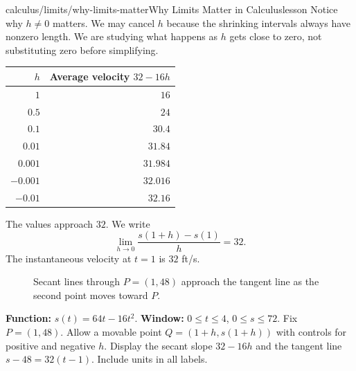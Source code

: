 \begin{webpage}{calculus/limits/why-limits-matter}{Why Limits Matter in Calculus}{lesson}
Notice why \(h\ne0\) matters. We may cancel \(h\) because the shrinking intervals always have nonzero length. We are studying what happens as \(h\) gets close to zero, not substituting zero before simplifying.

\begin{center}
\begin{tabular}{@{}r r@{}}
\toprule
\(h\) & Average velocity \(32-16h\)\\
\midrule
\(1\) & \(16\)\\
\(0.5\) & \(24\)\\
\(0.1\) & \(30.4\)\\
\(0.01\) & \(31.84\)\\
\(0.001\) & \(31.984\)\\
\(-0.001\) & \(32.016\)\\
\(-0.01\) & \(32.16\)\\
\bottomrule
\end{tabular}
\end{center}

The values approach \(32\). We write
\[
  \boxed{\lim_{h\to0}\frac{s(1+h)-s(1)}{h}=32}.
\]
The instantaneous velocity at \(t=1\) is \(32\) ft/s.

\begin{figure}[htbp]
\centering
{}
\caption{Secant lines through \(P=(1,48)\) approach the tangent line as the second point moves toward \(P\).}
\label{fig:secants}
\end{figure}

\begin{bggraphspec}
\textbf{Function:} \(s(t)=64t-16t^2\). \textbf{Window:} \(0\le t\le4\), \(0\le s\le72\). Fix \(P=(1,48)\). Allow a movable point \(Q=(1+h,s(1+h))\) with controls for positive and negative \(h\). Display the secant slope \(32-16h\) and the tangent line \(s-48=32(t-1)\). Include units in all labels.
\end{bggraphspec}


\end{webpage}
